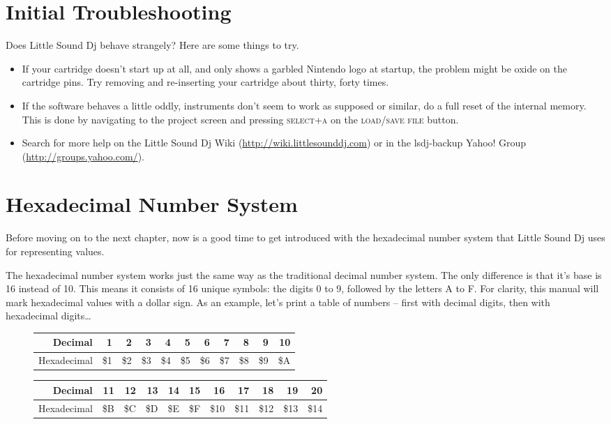 \section{Initial Troubleshooting}

Does Little Sound Dj behave strangely? Here are some things to try.

\begin{itemize}
\item If your cartridge doesn't start up at all, and only shows a garbled Nintendo logo at startup, the problem might be oxide on the cartridge pins. Try removing and re-inserting your cartridge about thirty, forty times.
\item If the software behaves a little oddly, instruments don't seem to work as supposed or similar, do a full reset of the internal memory. This is done by navigating to the project screen and pressing \textsc{select+a} on the \textsc{load/save file} button.
\item Search for more help on the Little Sound Dj Wiki (\url{http://wiki.littlesounddj.com}) or in the lsdj-backup Yahoo! Group (\url{http://groups.yahoo.com/}).
\end{itemize}

\section{Hexadecimal Number System}

Before moving on to the next chapter, now is a good time to get introduced with the hexadecimal number system that Little Sound Dj uses for representing values.

The hexadecimal number system works just the same way as the traditional decimal number system. The only difference is that it's base is 16 instead of 10. This means it consists of 16 unique symbols: the digits 0 to 9, followed by the letters A to F. For clarity, this manual will mark hexadecimal values with a dollar sign.
As an example, let's print a table of numbers -- first with decimal digits, then with
hexadecimal digits\ldots

\begin{figure}[hbtp]
\centering

\begin{tabular}{r|r|r|r|r|r|r|r|r|r|r}
 Decimal & 1 & 2 & 3 & 4 & 5 & 6 & 7 & 8 & 9 & 10 \\
\hline
 Hexadecimal & \$1 & \$2 & \$3 & \$4 & \$5 & \$6 & \$7 & \$8 & \$9 & \$A \\
\end{tabular}

\begin{tabular}{r|r|r|r|r|r|r|r|r|r|r}
 Decimal & 11 & 12 & 13 & 14 & 15 & 16 & 17 & 18 & 19 & 20 \\
\hline
 Hexadecimal & \$B & \$C & \$D & \$E & \$F & \$10 & \$11 & \$12 & \$13 & \$14  \\
\end{tabular}

\end{figure}

